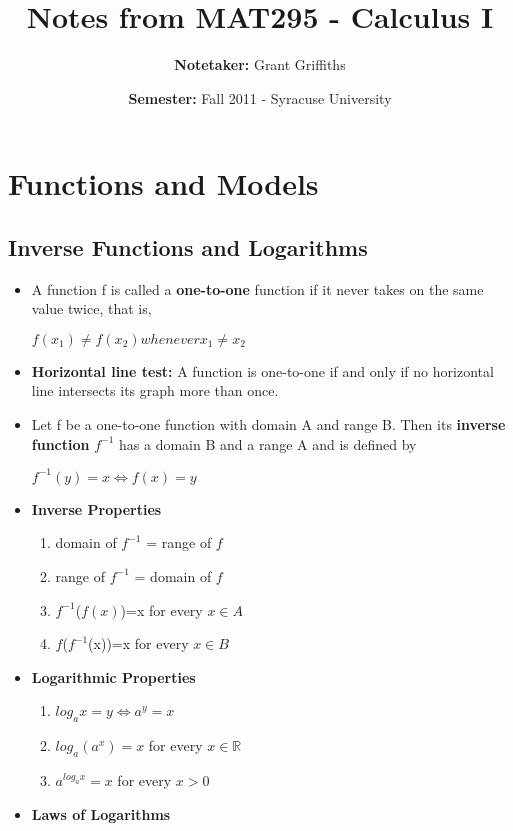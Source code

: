 \documentclass{report}
\title{\textbf{Notes from MAT295 - Calculus I}}
\author{\textbf{Notetaker: }Grant Griffiths}
\date{\textbf{Semester: }Fall 2011 - Syracuse University}
\newcommand{\Fin}{$f^{-1}$}
\begin{document}
   \maketitle
   \tableofcontents
\chapter{Functions and Models}
  \setcounter{section}{+5}
\section{Inverse Functions and Logarithms}
	\begin{itemize}\addtolength{\leftskip}{2em}
	\item A function f is called a \textbf{one-to-one} function if it never takes on the same value twice, that is,
	\begin{center}
	$f(x_1)\ne f(x_2) whenever x_1\ne x_2$
	\end{center}
	\item \textbf{Horizontal line test:} A function is one-to-one if and only if no horizontal line intersects its graph more than once. 
	\item Let f be a one-to-one function with domain A and range B. Then its \textbf{inverse function} $f^{-1}$ has a domain B and a range A and is  defined by
	\begin{center}
	$f^{-1}(y)=x \Longleftrightarrow f(x)=y$
	\end{center} 
	\item \textbf{Inverse Properties}
	\begin{enumerate}\addtolength{\leftskip}{4em}
		\item domain of {\Fin} = range of $f$
		\item range of {\Fin} = domain of $f$
		\item {\Fin($f(x)$)}=x for every $x \in A$
		\item {$f$(\Fin(x))}=x for every $x \in B$
	\end{enumerate}
	\item \textbf{Logarithmic Properties}
	\begin{enumerate}\addtolength{\leftskip}{4em}
		\item $log_ax=y \Longleftrightarrow a^y=x$
		\item $log_a(a^x)=x$ for every $x \in \mathbb{R}$
		\item $a^{log_ax}=x$ for every $x>0$
	\end{enumerate}
	\item \textbf{Laws of Logarithms}

\end{itemize}
\end{document}
